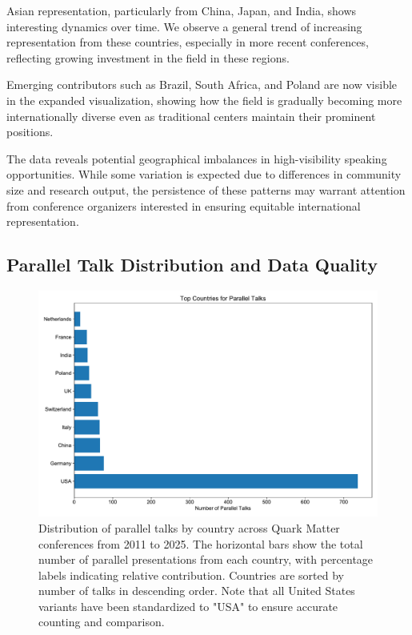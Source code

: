 \documentclass[a4paper,11pt]{article}
\begin{document}
Asian representation, particularly from China, Japan, and India, shows interesting dynamics over time. We observe a general trend of increasing representation from these countries, especially in more recent conferences, reflecting growing investment in the field in these regions.

Emerging contributors such as Brazil, South Africa, and Poland are now visible in the expanded visualization, showing how the field is gradually becoming more internationally diverse even as traditional centers maintain their prominent positions.

The data reveals potential geographical imbalances in high-visibility speaking opportunities. While some variation is expected due to differences in community size and research output, the persistence of these patterns may warrant attention from conference organizers interested in ensuring equitable international representation.

\subsection{Parallel Talk Distribution and Data Quality}

\begin{figure}[H]
\centering
\includegraphics[width=\textwidth]{figures/parallel_talks_by_country.pdf}
\caption{Distribution of parallel talks by country across Quark Matter conferences from 2011 to 2025. The horizontal bars show the total number of parallel presentations from each country, with percentage labels indicating relative contribution. Countries are sorted by number of talks in descending order. Note that all United States variants have been standardized to "USA" to ensure accurate counting and comparison.}
\label{fig:parallel_talks}
\end{figure}
\end{document}
